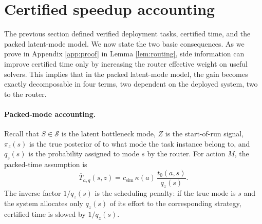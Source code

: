 \documentclass{article}
\newtheorem{remark}{Remark}
\newcommand{\cS}{\mathcal{S}}
\begin{document}




\section{Certified speedup accounting}
\label{sec:results}

The previous section defined verified deployment tasks, certified time, and the packed
latent-mode model.  We now state the two basic consequences.  As we prove in Appendix \ref{app:proof} in Lemma \ref{lem:routing}, side information can improve certified time only by increasing the router effective weight on useful solvers.  This implies that in the packed latent-mode model, the gain becomes exactly decomposable in four terms, two dependent on the deployed system, two to the router.

\paragraph{Packed-mode accounting.}
Recall that \(S\in\cS\) is the latent bottleneck mode, \(Z\) is the start-of-run signal, \(\pi_z(s)\) is the true posterior of to what mode the task instance belong to, and \(q_z(s)\) is the probability assigned to mode \(s\) by the router.
For action \(M\), the packed-time assumption is
\[
    \overline T_{a,q}(s,z)
    =
    c_{\mathrm{sim}}\,
    \kappa(a)\,
    \frac{t_0(a,s)}{q_z(s)} .
\]
The inverse factor \(1/q_z(s)\) is the scheduling penalty: if the true mode is \(s\) and
the system allocates only \(q_z(s)\) of its effort to the corresponding strategy, certified
time is slowed by \(1/q_z(s)\).
\end{document}
